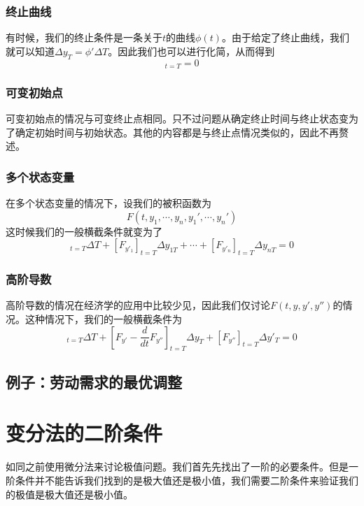 \documentclass[UTF8,12pt]{ctexart}
\numberwithin{equation}{section} %
\numberwithin{figure}{section}
\numberwithin{table}{section}
\begin{document}
	\subsubsection{终止曲线}
	有时候，我们的终止条件是一条关于$t$的曲线$\phi(t)$。由于给定了终止曲线，我们就可以知道$\Delta y_T = \phi ' \Delta T$。因此我们也可以进行化简，从而得到
	\begin{equation}
		[F + (\phi ' - y')F_{y'}]_{t = T} = 0
	\end{equation}

	\subsubsection{可变初始点}
	可变初始点的情况与可变终止点相同。只不过问题从确定终止时间与终止状态变为了确定初始时间与初始状态。其他的内容都是与终止点情况类似的，因此不再赘述。
	
	\subsubsection{多个状态变量}
	在多个状态变量的情况下，设我们的被积函数为
	\begin{equation}
		F(t,y_1,\cdots,y_n,y_1',\cdots,y_n')
	\end{equation}
	这时候我们的一般横截条件就变为了
	\begin{equation}
		[F - (y'_1F_{y'_1} + \cdots + y'_1F_{y'_1})]_{t = T}\Delta T + [F_{y'_1}]_{t = T}\Delta y_{1T} + \cdots + [F_{y'_n}]_{t = T}\Delta y_{nT} = 0
	\end{equation}
	
	\subsubsection{高阶导数}
	高阶导数的情况在经济学的应用中比较少见，因此我们仅讨论$F(t,y,y',y'')$的情况。这种情况下，我们的一般横截条件为
	\begin{equation}
		[F - y'F_{y'} - y''F_{y''} + y'\frac{d}{dt}F_{y''}]_{t=T}\Delta T 
		+ [F_{y'} - \frac{d}{dt}F_{y''}]_{t=T}\Delta y_T 
		+ [F_{y''}]_{t=T}\Delta y'_T = 0
	\end{equation}

	\subsection{例子：劳动需求的最优调整}
	
	\newpage
	
	\section{变分法的二阶条件}
	如同之前使用微分法来讨论极值问题。我们首先先找出了一阶的必要条件。但是一阶条件并不能告诉我们找到的是极大值还是极小值，我们需要二阶条件来验证我们的极值是极大值还是极小值。
	
\end{document}
